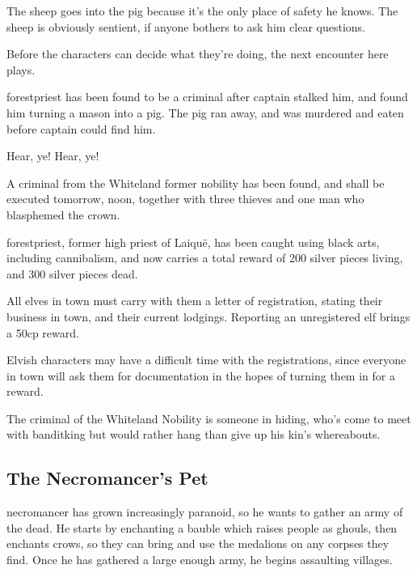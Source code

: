 \begin{multicols}{2}
The sheep goes into the \gls{pig} because it's the only place of safety he knows.  The sheep is obviously sentient, if anyone bothers to ask him clear questions.

Before the characters can decide what they're doing, the next encounter here plays.


\Gls{forestpriest} has been found to be a criminal after \gls{captain} stalked him, and found him turning a mason into a pig.  The pig ran away, and was murdered and eaten before \gls{captain} could find him.

\begin{speechtext}
	Hear, ye! Hear, ye!

	A criminal from the Whiteland former nobility has been found, and shall be executed tomorrow, noon, together with three thieves and one man who blasphemed the crown.

	\Gls{forestpriest}, former high priest of Laiqu\"{e}, has been caught using black arts, including cannibalism, and now carries a total reward of 200 silver pieces living, and 300 silver pieces dead.

	All elves in town must carry with them a letter of registration, stating their business in town, and their current lodgings.  Reporting an unregistered elf brings a 50cp reward.

\end{speechtext}

Elvish characters may have a difficult time with the registrations, since everyone in town will ask them for documentation in the hopes of turning them in for a reward.

The criminal of the Whiteland Nobility is someone in hiding, who's come to meet with \gls{banditking} but would rather hang than give up his kin's whereabouts.

\subsection[The Necromancer's Pet]{The Necromancer's Pet}\label{necromancerspet}

\Gls{necromancer} has grown increasingly paranoid, so he wants to gather an army of the dead.  He starts by enchanting a bauble which raises people as ghouls, then enchants crows, so they can bring and use the medalions on any corpses they find.  Once he has gathered a large enough army, he begins assaulting villages.


\end{multicols}
